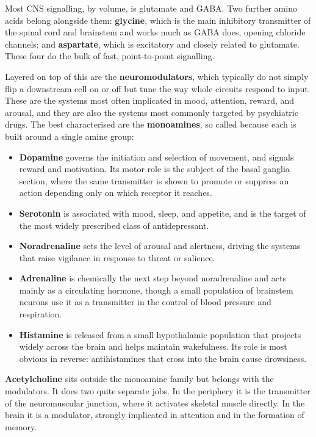 \documentclass[11pt]{article}
\begin{document}
Most CNS signalling, by volume, is glutamate and GABA. Two further amino acids belong alongside them: \textbf{glycine}, which is the main inhibitory transmitter of the spinal cord and brainstem and works much as GABA does, opening chloride channels; and \textbf{aspartate}, which is excitatory and closely related to glutamate. These four do the bulk of fast, point-to-point signalling.

Layered on top of this are the \textbf{neuromodulators}, which typically do not simply flip a downstream cell on or off but tune the way whole circuits respond to input. These are the systems most often implicated in mood, attention, reward, and arousal, and they are also the systems most commonly targeted by psychiatric drugs. The best characterised are the \textbf{monoamines}, so called because each is built around a single amine group:

\begin{itemize}
    \item \textbf{Dopamine} governs the initiation and selection of movement, and signals reward and motivation. Its motor role is the subject of the basal ganglia section, where the same transmitter is shown to promote or suppress an action depending only on which receptor it reaches.
    \item \textbf{Serotonin} is associated with mood, sleep, and appetite, and is the target of the most widely prescribed class of antidepressant.
    \item \textbf{Noradrenaline} sets the level of arousal and alertness, driving the systems that raise vigilance in response to threat or salience.
    \item \textbf{Adrenaline} is chemically the next step beyond noradrenaline and acts mainly as a circulating hormone, though a small population of brainstem neurons use it as a transmitter in the control of blood pressure and respiration.
    \item \textbf{Histamine} is released from a small hypothalamic population that projects widely across the brain and helps maintain wakefulness. Its role is most obvious in reverse: antihistamines that cross into the brain cause drowsiness.
\end{itemize}

\textbf{Acetylcholine} sits outside the monoamine family but belongs with the modulators. It does two quite separate jobs. In the periphery it is the transmitter of the neuromuscular junction, where it activates skeletal muscle directly. In the brain it is a modulator, strongly implicated in attention and in the formation of memory.
\end{document}
